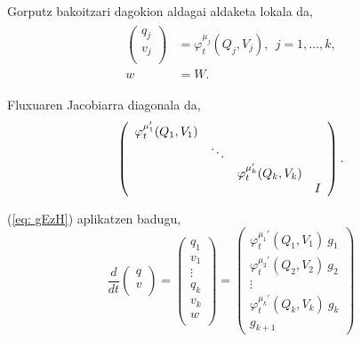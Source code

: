 Gorputz bakoitzari dagokion aldagai aldaketa lokala da,
\begin{align}
\label{eq:aldfl2}
\begin{split}
\left(\begin{array}{c}
                q_j  \\
                v_j  \\
\end{array}\right)&= \varphi_t^{\mu_j}(Q_j,V_j), \ \ j=1,\dots,k, \\
w&=W.
\end{split}
\end{align}

Fluxuaren Jacobiarra diagonala da,
\begin{equation*}
\left(\begin{array}{c c c c}
                \varphi_t^{\mu_1'}(Q_1,V_1) &  &                           &   \\
                                            & \ddots  &                           &   \\
                                            &         &\varphi_t^{\mu_k'}(Q_k,V_k) &   \\
                                            &         &                           & I \\                      
\end{array}\right).
\end{equation*}

(\ref{eq: gEzH}) aplikatzen badugu,
\begin{equation*}
\frac{d}{dt}\left(\begin{array}{c}
                q  \\
                v  \\
\end{array}\right)=
\left(\begin{array}{c}
                q_1  \\
                v_1  \\
                \vdots \\
                q_k    \\
                v_k    \\
                w      \\
\end{array}\right)=
\left(\begin{array}{c}
               \varphi_t^{\mu_1'}(Q_1,V_1) \ g_1 \\ 
               \varphi_t^{\mu_2'}(Q_2,V_2) \ g_2 \\
               \vdots \\
               \varphi_t^{\mu_k'}(Q_k,V_k) \ g_k \\
               g_{k+1}
\end{array}\right)
\end{equation*}